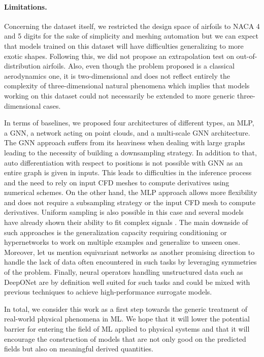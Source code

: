 \paragraph{Limitations.} Concerning the dataset itself, we restricted the design space of airfoils to NACA 4 and 5 digits for the sake of simplicity and meshing automation but we can expect that models trained on this dataset will have difficulties generalizing to more exotic shapes. Following this, we did not propose an extrapolation test on out-of-distribution airfoils. Also, even though the problem proposed is a classical aerodynamics one, it is two-dimensional and does not reflect entirely the complexity of three-dimensional natural phenomena which implies that models working on this dataset could not necessarily be extended to more generic three-dimensional cases.

In terms of baselines, we proposed four architectures of different types, an MLP, a GNN, a network acting on point clouds, and a multi-scale GNN architecture. The GNN approach suffers from its heaviness when dealing with large graphs leading to the necessity of building a downsampling strategy. In addition to that, auto differentiation with respect to positions is not possible with GNN as an entire graph is given in inputs. This leads to difficulties in the inference process and the need to rely on input CFD meshes to compute derivatives using numerical schemes. On the other hand, the MLP approach allows more flexibility and does not require a subsampling strategy or the input CFD mesh to compute derivatives. Uniform sampling is also possible in this case and several models have already shown their ability to fit complex signals \cite{siren,bacon}. The main downside of such approaches is the generalization capacity requiring conditioning or hypernetworks to work on multiple examples and generalize to unseen ones. Moreover, let us mention equivariant networks \cite{brandstetter2022geometric} as another promising direction to handle the lack of data often encountered in such tasks by leveraging symmetries of the problem. Finally, neural operators handling unstructured data such as DeepONet \cite{lu2021learning} are by definition well suited for such tasks and could be mixed with previous techniques to achieve high-performance surrogate models.

In total, we consider this work as a first step towards the generic treatment of real-world physical phenomena in ML. We hope that it will lower the potential barrier for entering the field of ML applied to physical systems and that it will encourage the construction of models that are not only good on the predicted fields but also on meaningful derived quantities.

